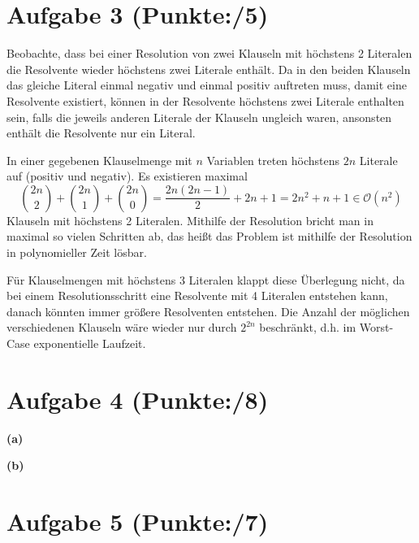 \documentclass[11pt, a4paper]{article}
\newcommand{\pp}{5}
\newcommand{\ppp}{8}
\newcommand{\pppp}{7}
\begin{document}
\section*{Aufgabe 3 (Punkte:\qquad/\pp)}
\begin{adjustwidth}{20pt}{20pt}
Beobachte, dass bei einer Resolution von zwei Klauseln mit höchstens 2 Literalen die Resolvente wieder höchstens zwei Literale enthält. Da in den beiden Klauseln das gleiche Literal einmal
negativ und einmal positiv auftreten muss, damit eine Resolvente existiert, können in der Resolvente höchstens zwei Literale enthalten sein, falls die jeweils anderen Literale der Klauseln ungleich waren, ansonsten enthält die Resolvente nur ein Literal.\par
In einer gegebenen Klauselmenge mit $n$ Variablen treten höchstens $2n$ Literale auf (positiv und negativ). Es existieren maximal
\[
	\binom{2n}{2}+\binom{2n}{1}+\binom{2n}{0} = \frac{2n(2n-1)}{2}+2n+1 = 2n^2+n+1 \in \mathcal{O}(n^2)
\]
Klauseln mit höchstens 2 Literalen. Mithilfe der Resolution bricht man in maximal so vielen Schritten ab, das heißt das Problem ist mithilfe der Resolution in polynomieller Zeit lösbar.\par
Für Klauselmengen mit höchstens 3 Literalen klappt diese Überlegung nicht, da bei einem Resolutionsschritt eine Resolvente mit 4 Literalen entstehen kann, danach könnten immer
größere Resolventen entstehen. Die Anzahl der möglichen verschiedenen Klauseln wäre wieder nur durch $2^{2n}$ beschränkt, d.h. im Worst-Case exponentielle Laufzeit.
\end{adjustwidth}





\section*{Aufgabe 4 (Punkte:\qquad/\ppp)}
\textbf{(a)}
\begin{adjustwidth}{20pt}{20pt}


\end{adjustwidth}
\textbf{(b)}
\begin{adjustwidth}{20pt}{20pt}


\end{adjustwidth}


\section*{Aufgabe 5 (Punkte:\qquad/\pppp)}
\begin{adjustwidth}{20pt}{20pt}

\end{adjustwidth}
\end{document}
